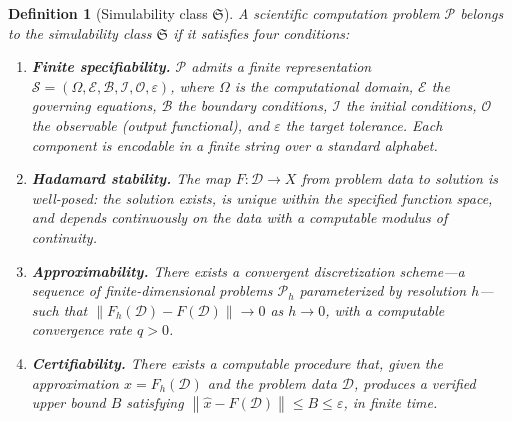 \documentclass[11pt,a4paper]{article}
\newtheorem{definition}{Definition}
\newcommand{\Sclass}{\mathfrak{S}}
\newcommand{\norm}[1]{\left\|#1\right\|}
\newcommand{\Spec}{\mathcal{S}}
\newcommand{\Domain}{\Omega}
\begin{document}
\begin{definition}[Simulability class $\Sclass$]
\label{def:simulability}
A scientific computation problem $\mathcal{P}$ belongs to the simulability class $\Sclass$ if it satisfies four conditions:
\begin{enumerate}[nosep,leftmargin=1.5em]
\item[\textbf{(S1)}] \textbf{Finite specifiability.} $\mathcal{P}$ admits a finite representation $\Spec = (\Domain, \mathcal{E}, \mathcal{B}, \mathcal{I}, \mathcal{O}, \varepsilon)$, where $\Domain$ is the computational domain, $\mathcal{E}$ the governing equations, $\mathcal{B}$ the boundary conditions, $\mathcal{I}$ the initial conditions, $\mathcal{O}$ the observable (output functional), and $\varepsilon$ the target tolerance. Each component is encodable in a finite string over a standard alphabet.
\item[\textbf{(S2)}] \textbf{Hadamard stability.} The map $F\colon \mathcal{D} \to X$ from problem data to solution is well-posed: the solution exists, is unique within the specified function space, and depends continuously on the data with a computable modulus of continuity.
\item[\textbf{(S3)}] \textbf{Approximability.} There exists a convergent discretization scheme---a sequence of finite-dimensional problems $\mathcal{P}_h$ parameterized by resolution $h$---such that $\norm{F_h(\mathcal{D}) - F(\mathcal{D})} \to 0$ as $h \to 0$, with a computable convergence rate $q > 0$.
\item[\textbf{(S4)}] \textbf{Certifiability.} There exists a computable procedure that, given the approximation $\hat{x} = F_h(\mathcal{D})$ and the problem data $\mathcal{D}$, produces a verified upper bound $B$ satisfying $\norm{\hat{x} - F(\mathcal{D})} \leq B \leq \varepsilon$, in finite time.
\end{enumerate}
\end{definition}
\end{document}
